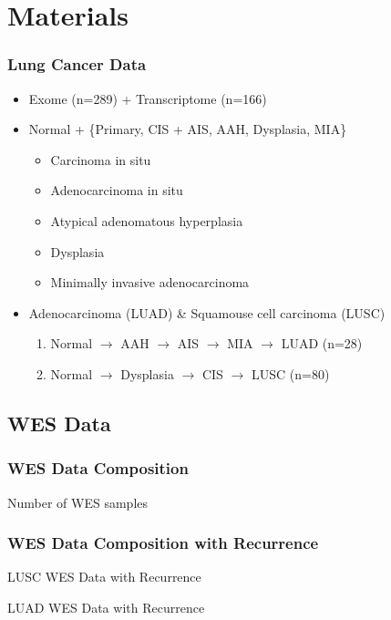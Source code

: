 \documentclass{beamer}
\begin{document}
    \section{Materials}
    \begin{frame}
        \frametitle{Lung Cancer Data}

        \begin{itemize}
            \item Exome (n=289) + Transcriptome (n=166)
            \item Normal + \{Primary, CIS + AIS, AAH, Dysplasia, MIA\}
            \begin{itemize}
                \item Carcinoma in situ
                \item Adenocarcinoma in situ
                \item Atypical adenomatous hyperplasia
                \item Dysplasia
                \item Minimally invasive adenocarcinoma
            \end{itemize}
            \item Adenocarcinoma (LUAD) \& Squamouse cell carcinoma (LUSC)
            \begin{enumerate}
                \item Normal $\rightarrow$ AAH $\rightarrow$ AIS $\rightarrow$ MIA $\rightarrow$ LUAD (n=28)
                \item Normal $\rightarrow$ Dysplasia $\rightarrow$ CIS $\rightarrow$ LUSC (n=80)
            \end{enumerate}
        \end{itemize}
    \end{frame}

    \subsection{WES Data}
    \begin{frame}
        \frametitle{WES Data Composition}

        \begin{table}
            \caption{Number of WES samples}
            \resizebox{!}{0.3 \textheight}
            {}
        \end{table}
    \end{frame}

    \begin{frame}[allowframebreaks]
        \frametitle{WES Data Composition with Recurrence}

        \begin{table}
            \caption{LUSC WES Data with Recurrence}
            \resizebox{!}{0.3 \textheight}
            {}
        \end{table}

        \begin{table}
            \caption{LUAD WES Data with Recurrence}
            
        \end{table}
    \end{frame}
\end{document}
